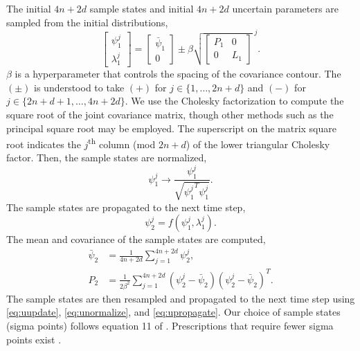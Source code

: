 The initial $4n + 2d$ sample states and initial $4n + 2d$
uncertain parameters are sampled from the initial distributions,
\begin{equation}\label{eq:uupdate}
  \begin{bmatrix} \psi_{1}^{j} \\ \lambda_{1}^{j} \end{bmatrix} =
  \begin{bmatrix} \bar{\psi}_{1} \\ 0\end{bmatrix}
    \pm \beta \sqrt{\begin{bmatrix} P_{1} & 0\\ 0 & L_{1}\end{bmatrix}}^{\; j}.
\end{equation}
$\beta$ is a hyperparameter that controls the spacing of the covariance contour.
The $(\pm)$ is understood to take $(+)$ for $j \in \{1, \dots, 2n + d\}$ and $(-)$ for
$j \in \{2n + d + 1, \dots, 4n + 2d\}$. We use the Cholesky factorization
to compute the square root of the
joint covariance matrix, though other methods
such as the principal square root may be employed.
The superscript on the matrix square root indicates the $j$\textsuperscript{th}
column (mod $2n + d$) of the lower triangular Cholesky factor.
Then, the sample states are normalized,
\begin{equation}\label{eq:unormalize}
  \psi_{1}^{j} \rightarrow \frac{\psi_{1}^{j}}{\sqrt{{\psi_{1}^{j}}^{T} \psi_{1}^{j}}}.
\end{equation}
The sample states are propagated to the next time step,
\begin{equation}\label{eq:upropagate}
  \psi^{j}_{2} = f(\psi^{j}_{1}, \lambda^{j}_{1}).
\end{equation}
The mean and covariance of the sample states are computed,
\begin{align}
  \bar{\psi}_{2} &= \frac{1}{4n + 2d} \sum_{j = 1}^{4n + 2d} \psi_{2}^{j},\\
  P_{2} &= \frac{1}{2 \beta^{2}} \sum_{j = 1}^{4n + 2d}
  (\psi^{j}_{2} - \bar{\psi}_{2})(\psi^{j}_{2} - \bar{\psi}_{2})^{T}.
\end{align}
The sample states are then resampled and propagated to the next time step using
\eqref{eq:uupdate}, \eqref{eq:unormalize}, and \eqref{eq:upropagate}. Our
choice of sample states (sigma points) follows equation 11 of
\cite{julier2004unscented}.
Prescriptions that require fewer sigma points exist \cite{julier2002reduced}.




